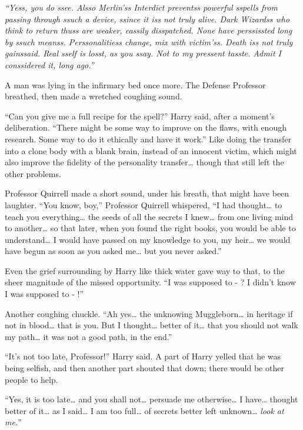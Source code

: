 \emph{``Yess, you do ssee. Alsso Merlin'ss Interdict preventss powerful
sspells from passing through ssuch a device, ssince it iss not truly
alive. Dark Wizardss who think to return thuss are weaker, eassily
disspatched. None have perssissted long by ssuch meanss. Perssonalitiess
change, mix with victim'ss. Death iss not truly gainssaid. Real sself is
losst, as you ssay. Not to my pressent tasste. Admit I conssidered it,
long ago.''}

A man was lying in the infirmary bed once more. The Defense Professor
breathed, then made a wretched coughing sound.

``Can you give me a full recipe for the spell?'' Harry said, after a
moment's deliberation. ``There might be some way to improve on the
flaws, with enough research. Some way to do it ethically and have it
work.'' Like doing the transfer into a clone body with a blank brain,
instead of an innocent victim, which might also improve the fidelity of
the personality transfer\ldots{} though that still left the other
problems.

Professor Quirrell made a short sound, under his breath, that might have
been laughter. ``You know, boy,'' Professor Quirrell whispered, ``I had
thought\ldots{} to teach you everything\ldots{} the seeds of all the
secrets I knew\ldots{} from one living mind to another\ldots{} so that
later, when you found the right books, you would be able to
understand\ldots{} I would have passed on my knowledge to you, my
heir\ldots{} we would have begun as soon as you asked me\ldots{} but you
never asked.''

Even the grief surrounding by Harry like thick water gave way to that,
to the sheer magnitude of the missed opportunity. ``I was supposed to -
? I didn't know I was supposed to - !''

Another coughing chuckle. ``Ah yes\ldots{} the unknowing
Muggleborn\ldots{} in heritage if not in blood\ldots{} that is you. But
I thought\ldots{} better of it\ldots{} that you should not walk my
path\ldots{} it was not a good path, in the end.''

``It's not too late, Professor!'' Harry said. A part of Harry yelled
that he was being selfish, and then another part shouted that down;
there would be other people to help.

``Yes, it is too late\ldots{} and you shall not\ldots{} persuade me
otherwise\ldots{} I have\ldots{} thought better of it\ldots{} as I
said\ldots{} I am too full\ldots{} of secrets better left
unknown\ldots{} \emph{look at me.}''

